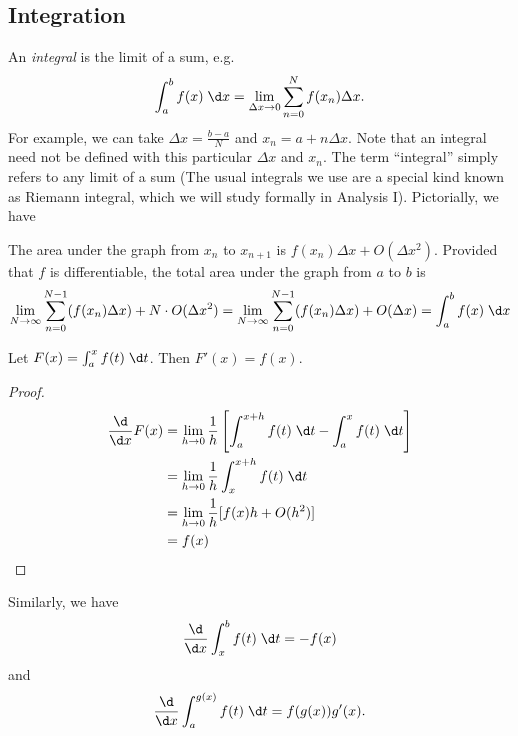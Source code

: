 \documentclass[a4paper]{article}
\begin{document}
\subsection{Integration}
\begin{defi}[Integral]
  An \emph{integral} is the limit of a sum, e.g.
  \[
    \int_a^b f(x) \;\d x = \lim_{\Delta x\to 0}\sum_{n=0}^N f(x_n)\Delta x.
  \]
  For example, we can take $\Delta x=\frac{b - a}{N}$ and $x_n = a + n\Delta x$. Note that an integral need not be defined with this particular $\Delta x$ and $x_n$. The term ``integral'' simply refers to any limit of a sum (The usual integrals we use are a special kind known as Riemann integral, which we will study formally in Analysis I). Pictorially, we have
  \begin{center}
  \end{center}
\end{defi}

The area under the graph from $x_n$ to $x_{n+1}$ is $f(x_n)\Delta x + O(\Delta x^2)$. Provided that $f$ is differentiable, the total area under the graph from $a$ to $b$ is
\[
  \lim_{N\to \infty} \sum_{n=0}^{N-1}(f(x_n)\Delta x) + N\cdot O(\Delta x^2) = \lim_{N\to \infty} \sum_{n=0}^{N-1}(f(x_n)\Delta x) + O(\Delta x) = \int_a^b f(x)\;\d x
\]
\begin{thm}
  Let $F(x) = \int_a^x f(t)\;\d t$. Then $F'(x) = f(x)$.
\end{thm}

\begin{proof}
  \begin{align*}
    \frac{\d}{\d x}F(x) &= \lim_{h\to 0}\frac{1}{h}\left[\int_a^{x+h}f(t)\;\d t - \int_a^x f(t)\;\d t\right]\\
    &= \lim_{h\to 0} \frac{1}{h}\int_x^{x+h}f(t) \;\d t\\
    &= \lim_{h\to 0} \frac{1}{h}[f(x)h + O(h^2)]\\
    &= f(x)
  \end{align*}
\end{proof}
Similarly, we have
\[
  \frac{\d}{\d x}\int_x^b f(t)\;\d t = -f(x)
\]
and
\[
  \frac{\d}{\d x}\int_a^{g(x)} f(t)\;\d t = f(g(x))g'(x).
\]
\end{document}
